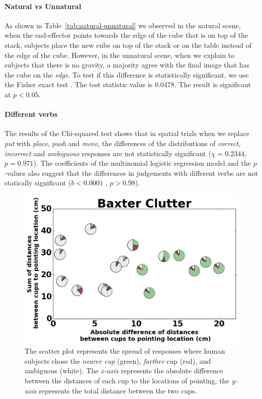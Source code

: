 \paragraph{Natural vs Unnatural}

As shown in Table~\ref{tab:natural-unnatural} we observed in the natural scene, when the end-effector points towards the edge of the cube that is on top of the stack, subjects place the new cube on top of the stack or on the table instead of the edge of the cube. However, in the unnatural scene, when we explain to subjects that there is no gravity, a majority agree with the final image that has the cube on the \textit{edge}. To test if this difference is statistically significant, we use the Fisher exact test \cite{10.2307/2340521}. The test statistic value is $0.0478$. The result is significant at $p < 0.05$. 


\paragraph{Different verbs}
The results of the Chi-squared test shows that in spatial trials when we replace \textit{put} with \textit{place}, \textit{push} and \textit{move}, the differences of the distributions of \textit{correct}, \textit{incorrect} and \textit{ambiguous} responses are not statistically significant ($\chi=0.2344 $, $p = 0.971$). The coefficients of the multinomial logistic regression model and the $p$-values also suggest that the differences in judgements 
with different verbs are not statically significant ($b<0.0001$ , $p>0.98$).


\begin{figure}[ht]
    \centering
    \includegraphics[width=\linewidth]{figures/baxter_Clutter_granular.png}
    \caption{The scatter plot represents the spread of responses where human subjects chose the \textit{nearer cup} (green), \textit{farther} cup (red), and ambiguous (white). The \textit{x-axis} represents the absolute difference between the distances of each cup to the locations of pointing, the \textit{y-axis} represents the total distance between the two cups.}
    \label{fig:cluttered}
\end{figure}
